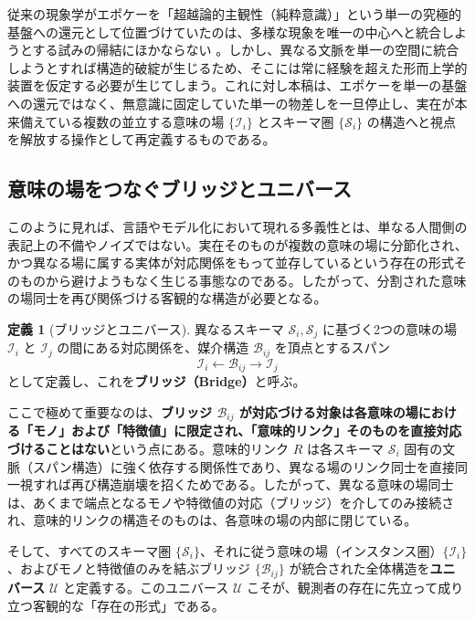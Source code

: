 \documentclass[11pt,a4paper,luatex]{jlreq}
\theoremstyle{definition}
\newtheorem{definition}{定義}[section]
\theoremstyle{plain}
\begin{document}
従来の現象学がエポケーを「超越論的主観性（純粋意識）」という単一の究極的基盤への還元として位置づけていたのは、多様な現象を唯一の中心へと統合しようとする試みの帰結にほかならない \cite{husserl1913}。しかし、異なる文脈を単一の空間に統合しようとすれば構造的破綻が生じるため、そこには常に経験を超えた形而上学的装置を仮定する必要が生じてしまう。これに対し本稿は、エポケーを単一の基盤への還元ではなく、無意識に固定していた単一の物差しを一旦停止し、実在が本来備えている複数の並立する意味の場 $\{\mathcal{I}_i\}$ とスキーマ圏 $\{\mathcal{S}_i\}$ の構造へと視点を解放する操作として再定義するものである。

\subsection{意味の場をつなぐブリッジとユニバース}

このように見れば、言語やモデル化において現れる多義性とは、単なる人間側の表記上の不備やノイズではない。実在そのものが複数の意味の場に分節化され、かつ異なる場に属する実体が対応関係をもって並存しているという存在の形式そのものから避けようもなく生じる事態なのである。したがって、分割された意味の場同士を再び関係づける客観的な構造が必要となる。

\begin{definition}[ブリッジとユニバース]
異なるスキーマ $\mathcal{S}_i, \mathcal{S}_j$ に基づく2つの意味の場 $\mathcal{I}_{i}$ と $\mathcal{I}_{j}$ の間にある対応関係を、媒介構造 $\mathcal{B}_{ij}$ を頂点とするスパン \cite{fong2019}
\begin{equation*}
\mathcal{I}_i \leftarrow \mathcal{B}_{ij} \rightarrow \mathcal{I}_j
\end{equation*}
として定義し、これを\textbf{ブリッジ（Bridge）}と呼ぶ。
\end{definition}

ここで極めて重要なのは、\textbf{ブリッジ $\mathcal{B}_{ij}$ が対応づける対象は各意味の場における「モノ」および「特徴値」に限定され、「意味的リンク」そのものを直接対応づけることはない}という点にある。意味的リンク $R$ は各スキーマ $\mathcal{S}_{i}$ 固有の文脈（スパン構造）に強く依存する関係性であり、異なる場のリンク同士を直接同一視すれば再び構造崩壊を招くためである。したがって、異なる意味の場同士は、あくまで端点となるモノや特徴値の対応（ブリッジ）を介してのみ接続され、意味的リンクの構造そのものは、各意味の場の内部に閉じている。

そして、すべてのスキーマ圏 $\{\mathcal{S}_i\}$、それに従う意味の場（インスタンス圏）$\{\mathcal{I}_i\}$、およびモノと特徴値のみを結ぶブリッジ $\{\mathcal{B}_{ij}\}$ が統合された全体構造を\textbf{ユニバース} $\mathcal{U}$ と定義する。このユニバース $\mathcal{U}$ こそが、観測者の存在に先立って成り立つ客観的な「存在の形式」である。
\end{document}
